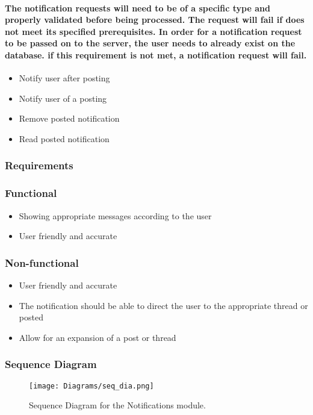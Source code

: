 \documentclass[12pt]{article}
\begin{document}
\paragraph{The notification requests will need to be of a specific type and properly validated before being processed. The request will fail if does not meet its specified prerequisites. In order for a notification request to be passed on to the server, the user needs to already exist on the database. if this requirement is not met, a notification request will fail.}
\begin{itemize}
\item Notify user after posting
\item Notify user of a posting
\item Remove posted notification 
\item Read posted notification
\end{itemize}
\subsubsection{Requirements}
\subsubsection*{Functional}
\begin{itemize}
\item Showing appropriate messages according to the user
\item User friendly and accurate
\end{itemize}
\subsubsection*{Non-functional}
\begin{itemize}
\item User friendly and accurate
\item The notification should be able to direct the user to the appropriate thread or posted
\item Allow for an expansion of a post or thread 
\end{itemize}
\subsubsection{Sequence Diagram}
\begin{figure}[h]
\texttt{[image: Diagrams/seq\_dia.png]}
\caption{Sequence Diagram for the Notifications module.}
\label{seq_dia}
\end{figure}
\end{document}
